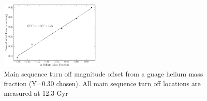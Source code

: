 \begin{figure}
  \centering
  \includegraphics[width=0.45\textwidth]{figures/ngc2808/HeliumMeanOffset.pdf}
  \caption{Main sequence turn off magnitude offset from a guage helium mass fraction (Y=0.30 chosen). All main sequence turn off locations are measured at 12.3 Gyr}
  \label{fig:HeMO}
\end{figure}
